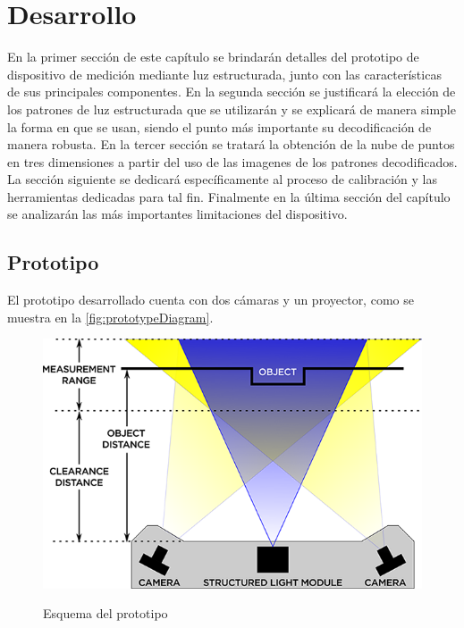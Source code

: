 \chapter{Desarrollo}\label{ch:desarrollo}

En la primer sección de este capítulo se brindarán detalles del prototipo de dispositivo de medición mediante luz estructurada, junto con las características de sus principales componentes. 
En la segunda sección se justificará la elección de los patrones de luz estructurada que se utilizarán y se explicará de manera simple la forma en que se usan, siendo el punto más importante su decodificación de manera robusta. 
En la tercer sección se tratará la obtención de la nube de puntos en tres dimensiones a partir del uso de las imagenes de los patrones decodificados. 
La sección siguiente se dedicará específicamente al proceso de calibración y las herramientas dedicadas para tal fin. 
Finalmente en la última sección del capítulo se analizarán las más importantes limitaciones del dispositivo.

\section{Prototipo}
El prototipo desarrollado cuenta con dos cámaras y un proyector, como se muestra en la \autoref{fig:prototypeDiagram}.

\begin{figure}[!bth]
    \myfloatalign
        {\includegraphics[width=1.0\linewidth]{images/lmi3d/Gocator-3100-howitworks}}
        \caption{Esquema del prototipo}
        \label{fig:prototypeDiagram}
\end{figure}

